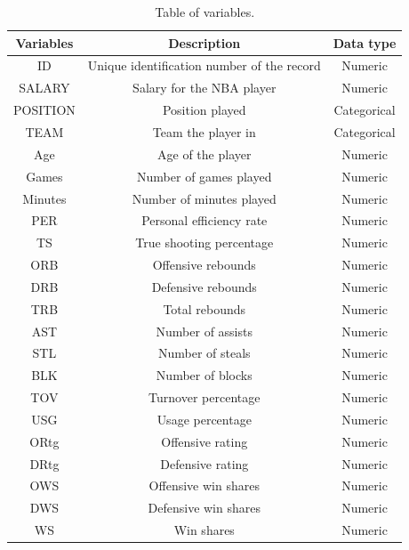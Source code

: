 \documentclass[letterpaper,12pt,twoside,]{pinp}
\begin{document}
\begin{table}[ht]
\centering
\begin{tabular}{ |c|c|c|} 
\hline
\textbf{Variables} & \textbf{Description} & \textbf{Data type}\\
\hline
ID & Unique identification number of the record & Numeric\\ 
SALARY & Salary for the NBA player & Numeric \\
POSITION & Position played & Categorical \\
TEAM & Team the player in & Categorical \\
Age & Age of the player & Numeric \\
Games & Number of games played & Numeric \\
Minutes & Number of minutes played & Numeric  \\
PER & Personal efficiency rate & Numeric  \\ 
TS & True shooting percentage & Numeric  \\
ORB & Offensive rebounds & Numeric  \\
DRB & Defensive rebounds & Numeric  \\
TRB & Total rebounds & Numeric  \\
AST & Number of assists & Numeric  \\
STL & Number of steals & Numeric  \\
BLK & Number of blocks & Numeric  \\
TOV & Turnover percentage & Numeric  \\
USG & Usage percentage & Numeric  \\
ORtg & Offensive rating & Numeric  \\
DRtg & Defensive rating & Numeric  \\
OWS & Offensive win shares & Numeric  \\
DWS & Defensive win shares  & Numeric \\
WS & Win shares & Numeric  \\
\hline
\end{tabular}
\centering
\caption{Table of variables.}
\label{table:var}
\end{table}
\end{document}
